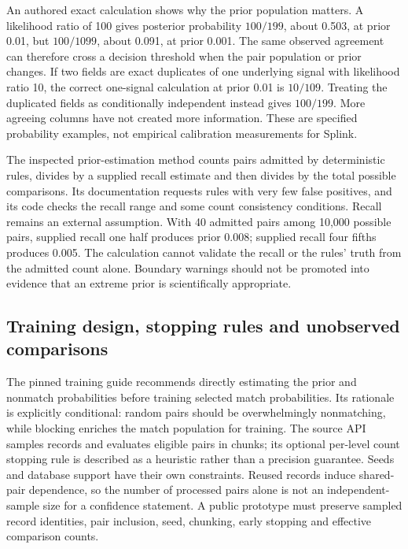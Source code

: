 An authored exact calculation shows why the prior population matters. A likelihood ratio of 100 gives posterior probability $100/199$, about 0.503, at prior 0.01, but $100/1099$, about 0.091, at prior 0.001. The same observed agreement can therefore cross a decision threshold when the pair population or prior changes. If two fields are exact duplicates of one underlying signal with likelihood ratio 10, the correct one-signal calculation at prior 0.01 is $10/109$. Treating the duplicated fields as conditionally independent instead gives $100/199$. More agreeing columns have not created more information. These are specified probability examples, not empirical calibration measurements for Splink.~\citep{exec24_splink_contract}

The inspected prior-estimation method counts pairs admitted by deterministic rules, divides by a supplied recall estimate and then divides by the total possible comparisons. Its documentation requests rules with very few false positives, and its code checks the recall range and some count consistency conditions. Recall remains an external assumption. With 40 admitted pairs among 10,000 possible pairs, supplied recall one half produces prior 0.008; supplied recall four fifths produces 0.005. The calculation cannot validate the recall or the rules' truth from the admitted count alone. Boundary warnings should not be promoted into evidence that an extreme prior is scientifically appropriate.~\citep{exec24_splink_sources,exec24_splink_contract}

\subsection{Training design, stopping rules and unobserved comparisons}
The pinned training guide recommends directly estimating the prior and nonmatch probabilities before training selected match probabilities. Its rationale is explicitly conditional: random pairs should be overwhelmingly nonmatching, while blocking enriches the match population for training. The source API samples records and evaluates eligible pairs in chunks; its optional per-level count stopping rule is described as a heuristic rather than a precision guarantee. Seeds and database support have their own constraints. Reused records induce shared-pair dependence, so the number of processed pairs alone is not an independent-sample size for a confidence statement. A public prototype must preserve sampled record identities, pair inclusion, seed, chunking, early stopping and effective comparison counts.~\citep{exec24_splink_sources,exec24_splink_contract}

